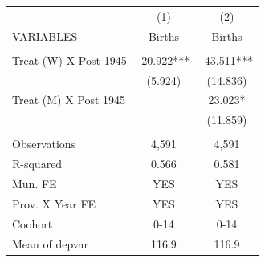 \begin{tabular}{lcc} \hline
 & (1) & (2) \\
VARIABLES & Births & Births \\ \hline
 &  &  \\
Treat (W) X Post 1945 & -20.922*** & -43.511*** \\
 & (5.924) & (14.836) \\
Treat (M) X Post 1945 &  & 23.023* \\
 &  & (11.859) \\
 &  &  \\
Observations & 4,591 & 4,591 \\
R-squared & 0.566 & 0.581 \\
Mun. FE & YES & YES \\
Prov. X Year FE & YES & YES \\
Coohort & 0-14 & 0-14 \\
 Mean of depvar & 116.9 & 116.9 \\ \hline
\end{tabular}
